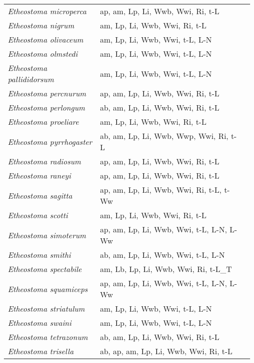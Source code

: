 {\begin{longtable}[c]{p{3.5cm}p{5.5cm}p{5.5cm}}
\emph{Etheostoma microperca} &  ap, am, Lp, Li, Wwb, Wwi, Ri, t-L & \citet{JohnHatc1991} \\
\emph{Etheostoma nigrum} &  am, Lp, Li, Wwb, Wwi, Ri, t-L & \citet{Karr1963} \\
\emph{Etheostoma olivaceum} &  am, Lp, Li, Wwb, Wwi, t-L, L-N & \citet{Page1980} \\
\emph{Etheostoma olmstedi} &  am, Lp, Li, Wwb, Wwi, t-L, L-N & \citet{Tsai1972} \\
\emph{Etheostoma pallididorsum} &  am, Lp, Li, Wwb, Wwi, t-L, L-N & \citet{HambRobi1979} \\
\emph{Etheostoma percnurum} &  ap, am, Lp, Li, Wwb, Wwi, Ri, t-L & \citet{Laym1991} \\
\emph{Etheostoma perlongum} &  ab, am, Lp, Li, Wwb, Wwi, Ri, t-L & \citet{ShutShut1982} \\
\emph{Etheostoma proeliare} &  am, Lp, Li, Wwb, Wwi, Ri, t-L & \citet{BartPowe2010,BurrPage1978} \\
\emph{Etheostoma pyrrhogaster} &  ab, am, Lp, Li, Wwb, Wwp, Wwi, Ri, t-L & \citet{CarnBurr1989} \\
\emph{Etheostoma radiosum} &  ap, am, Lp, Li, Wwb, Wwi, Ri, t-L & \citet{Scal1971} \\
\emph{Etheostoma raneyi} &  ap, am, Lp, Li, Wwb, Wwi, Ri, t-L & \citet{JohnHaag1996} \\
\emph{Etheostoma sagitta} &  ap, am, Lp, Li, Wwb, Wwi, Ri, t-L, t-Ww & \citet{Lowe1979} \\
\emph{Etheostoma scotti} &  am, Lp, Li, Wwb, Wwi, Ri, t-L & \citet{BartPowe2010} \\
\emph{Etheostoma simoterum} &  ap, am, Lp, Li, Wwb, Wwi, t-L, L-N, L-Ww & \citet{PageMayd1981} \\
\emph{Etheostoma smithi} &  ab, am, Lp, Li, Wwb, Wwi, t-L, L-N & \citet{PageBurr1976} \\
\emph{Etheostoma spectabile} &  am, Lb, Lp, Li, Wwb, Wwi, Ri, t-L\_T & \citet{West1966} \\
\emph{Etheostoma squamiceps} &  ap, am, Lp, Li, Wwb, Wwi, t-L, L-N, L-Ww & \citet{Page1974} \\
\emph{Etheostoma striatulum} &  am, Lp, Li, Wwb, Wwi, t-L, L-N & \citet{Page1980} \\
\emph{Etheostoma swaini} &  am, Lp, Li, Wwb, Wwi, t-L, L-N & \citet{RuplMcMi1984} \\
\emph{Etheostoma tetrazonum} &  ab, am, Lp, Li, Wwb, Wwi, Ri, t-L & \citet{TabeTabe1983} \\
\emph{Etheostoma trisella} &  ab, ap, am, Lp, Li, Wwb, Wwi, Ri, t-L & \citet{Ryon1986} \\

\end{longtable}}

